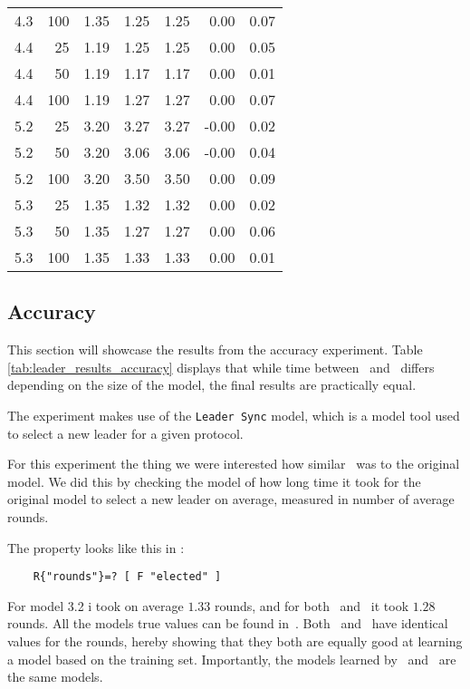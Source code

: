 \begin{table}[htb!]
\begin{tabular}{rrrrrrr}
        4.3           & 100   & 1.35   & 1.25    & 1.25    & 0.00     & 0.07   \\
        4.4           & 25    & 1.19   & 1.25    & 1.25    & 0.00     & 0.05   \\
        4.4           & 50    & 1.19   & 1.17    & 1.17    & 0.00     & 0.01   \\
        4.4           & 100   & 1.19   & 1.27    & 1.27    & 0.00     & 0.07   \\
        5.2           & 25    & 3.20   & 3.27    & 3.27    & -0.00    & 0.02   \\
        5.2           & 50    & 3.20   & 3.06    & 3.06    & -0.00    & 0.04   \\
        5.2           & 100   & 3.20   & 3.50    & 3.50    & 0.00     & 0.09   \\
        5.3           & 25    & 1.35   & 1.32    & 1.32    & 0.00     & 0.02   \\
        5.3           & 50    & 1.35   & 1.27    & 1.27    & 0.00     & 0.06   \\
        5.3           & 100   & 1.35   & 1.33    & 1.33    & 0.00     & 0.01   \\
        \bottomrule
    \end{tabular}
\end{table}
\subsection{Accuracy}\label{subsec:accuracy}

This section will showcase the results from the accuracy experiment.
Table \autoref{tab:leader_results_accuracy} displays that while time between \Cupaal\ and \Jajapy\ differs depending on the size of the model, the final results are practically equal.

The experiment makes use of the \texttt{Leader Sync} model, which is a model tool used to select a new leader for a given protocol.

For this experiment the thing we were interested how similar \Cupaal\ was to the original model.
We did this by checking the model of how long time it took for the original model to select a new leader on average, measured in number of average rounds.

The property looks like this in \Prism :
\begin{verbatim}
    R{"rounds"}=? [ F "elected" ]
\end{verbatim}

For model 3.2 i took on average $1.33$ rounds, and for both \Cupaal\ and \Jajapy\ it took $1.28$ rounds.
All the models true values can be found in~\cite{kwiatkowska2012prism}.
Both \Cupaal\ and \Jajapy\ have identical values for the rounds, hereby showing that they both are equally good at learning a model based on the training set.
Importantly, the models learned by \Cupaal\ and \Jajapy\ are the same models.

